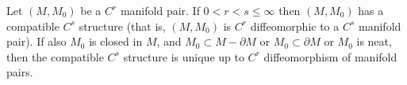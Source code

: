 Let $(M,M_0)$ be a $C^r$ manifold pair. If $0 < r < s \leqslant \infty$ then $(M,M_0)$ has a compatible $C^s$ structure (that is, $(M,M_0)$ is $C^r$ diffeomorphic to a $C^s$ manifold pair). If also $M_0$ is closed in $M$, and $M_0 \subset M - \partial M$ or $M_0 \subset \partial M$ or $M_0$ is neat, then the compatible $C^s$ structure is unique up to $C^r$ diffeomorphism of manifold pairs.
